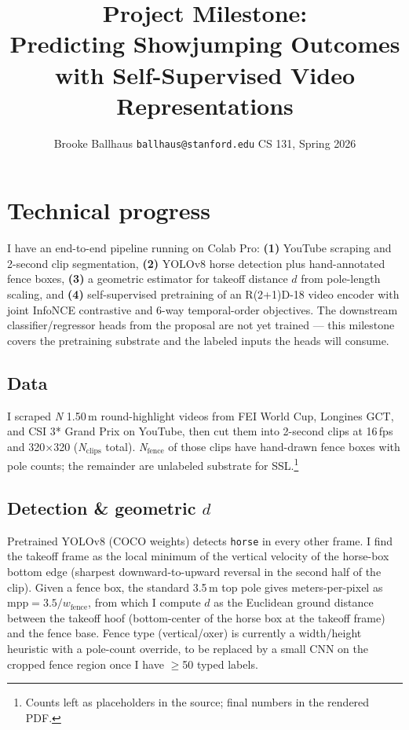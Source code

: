 \documentclass[10pt]{article}
\title{\vspace{-2em}Project Milestone:\\Predicting Showjumping Outcomes with Self-Supervised Video Representations}
\author{Brooke Ballhaus \quad \texttt{ballhaus@stanford.edu} \quad CS 131, Spring 2026}
\date{\vspace{-1em}}
\begin{document}
\maketitle
\vspace{-2.5em}

\section{Technical progress}

I have an end-to-end pipeline running on Colab Pro: \textbf{(1)} YouTube scraping
and 2-second clip segmentation, \textbf{(2)} YOLOv8 horse detection plus
hand-annotated fence boxes, \textbf{(3)} a geometric estimator for takeoff
distance $d$ from pole-length scaling, and \textbf{(4)} self-supervised
pretraining of an R(2+1)D-18 video encoder with joint InfoNCE contrastive and
6-way temporal-order objectives. The downstream classifier/regressor heads from
the proposal are not yet trained --- this milestone covers the pretraining
substrate and the labeled inputs the heads will consume.

\subsection*{Data}
I scraped \textit{N} 1.50\,m round-highlight videos from FEI World Cup, Longines
GCT, and CSI 3* Grand Prix on YouTube, then cut them into 2-second clips at
16\,fps and 320$\times$320 (\textit{N}$_{\text{clips}}$ total). \textit{N}$_{\text{fence}}$ of those
clips have hand-drawn fence boxes with pole counts; the remainder are unlabeled
substrate for SSL.\footnote{Counts left as placeholders in the source; final
numbers in the rendered PDF.}

\subsection*{Detection \& geometric $d$}
Pretrained YOLOv8 (COCO weights) detects \texttt{horse} in every other frame.
I find the takeoff frame as the local minimum of the vertical velocity of the
horse-box bottom edge (sharpest downward-to-upward reversal in the second half
of the clip). Given a fence box, the standard 3.5\,m top pole gives
meters-per-pixel as $\text{mpp} = 3.5 / w_{\text{fence}}$, from which I compute
$d$ as the Euclidean ground distance between the takeoff hoof (bottom-center of
the horse box at the takeoff frame) and the fence base. Fence type
(vertical/oxer) is currently a width/height heuristic with a pole-count
override, to be replaced by a small CNN on the cropped fence region once I have
$\geq$50 typed labels.
\end{document}
